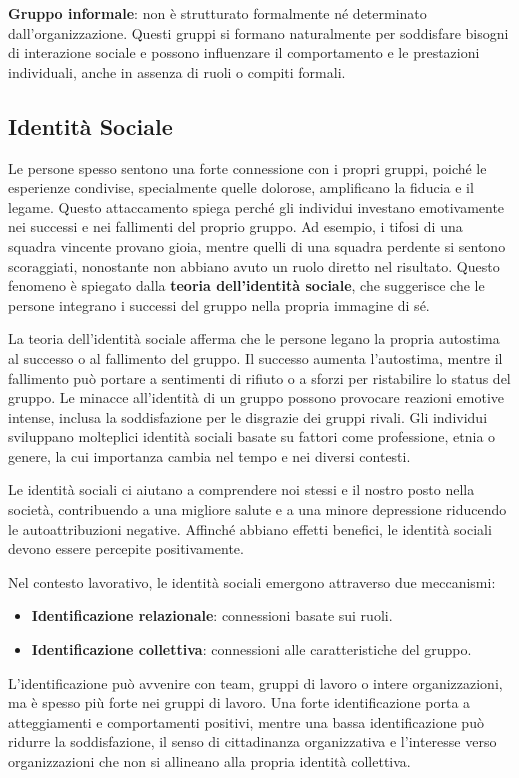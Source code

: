\documentclass{article}
\begin{document}
\textbf{Gruppo informale}: non è strutturato formalmente né determinato dall'organizzazione. Questi gruppi si formano naturalmente per soddisfare bisogni di interazione sociale e possono influenzare il comportamento e le prestazioni individuali, anche in assenza di ruoli o compiti formali.

\subsection{Identità Sociale}

Le persone spesso sentono una forte connessione con i propri gruppi, poiché le esperienze condivise, specialmente quelle dolorose, amplificano la fiducia e il legame. Questo attaccamento spiega perché gli individui investano emotivamente nei successi e nei fallimenti del proprio gruppo. Ad esempio, i tifosi di una squadra vincente provano gioia, mentre quelli di una squadra perdente si sentono scoraggiati, nonostante non abbiano avuto un ruolo diretto nel risultato. Questo fenomeno è spiegato dalla \textbf{teoria dell'identità sociale}, che suggerisce che le persone integrano i successi del gruppo nella propria immagine di sé.

La teoria dell'identità sociale afferma che le persone legano la propria autostima al successo o al fallimento del gruppo. Il successo aumenta l'autostima, mentre il fallimento può portare a sentimenti di rifiuto o a sforzi per ristabilire lo status del gruppo. Le minacce all'identità di un gruppo possono provocare reazioni emotive intense, inclusa la soddisfazione per le disgrazie dei gruppi rivali. Gli individui sviluppano molteplici identità sociali basate su fattori come professione, etnia o genere, la cui importanza cambia nel tempo e nei diversi contesti.

Le identità sociali ci aiutano a comprendere noi stessi e il nostro posto nella società, contribuendo a una migliore salute e a una minore depressione riducendo le autoattribuzioni negative. Affinché abbiano effetti benefici, le identità sociali devono essere percepite positivamente.

Nel contesto lavorativo, le identità sociali emergono attraverso due meccanismi:
\begin{itemize}
    \item \textbf{Identificazione relazionale}: connessioni basate sui ruoli.
    \item \textbf{Identificazione collettiva}: connessioni alle caratteristiche del gruppo.
\end{itemize}
L'identificazione può avvenire con team, gruppi di lavoro o intere organizzazioni, ma è spesso più forte nei gruppi di lavoro. Una forte identificazione porta a atteggiamenti e comportamenti positivi, mentre una bassa identificazione può ridurre la soddisfazione, il senso di cittadinanza organizzativa e l'interesse verso organizzazioni che non si allineano alla propria identità collettiva.
\end{document}
